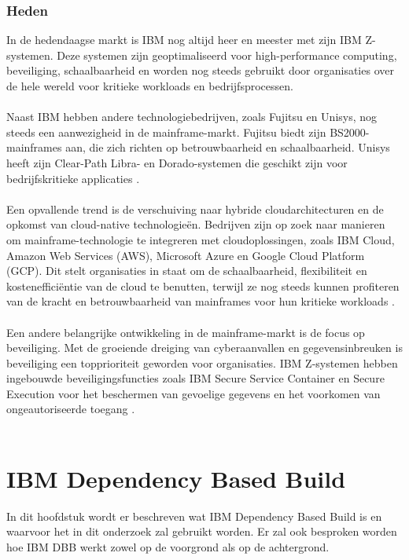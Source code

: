 \subsubsection{Heden}
In de hedendaagse markt is IBM nog altijd heer en meester met zijn IBM Z-systemen. Deze systemen zijn geoptimaliseerd voor high-performance computing, beveiliging, schaalbaarheid en worden nog steeds gebruikt door organisaties over de hele wereld voor kritieke workloads en bedrijfsprocessen.
\\ \\
Naast IBM hebben andere technologiebedrijven, zoals Fujitsu en Unisys, nog steeds een aanwezigheid in de mainframe-markt. Fujitsu biedt zijn BS2000-mainframes aan, die zich richten op betrouwbaarheid en schaalbaarheid. Unisys heeft zijn Clear-Path Libra- en Dorado-systemen die geschikt zijn voor bedrijfskritieke applicaties \autocite{Fujitsu} \autocite{Unisys}.
\\ \\
Een opvallende trend is de verschuiving naar hybride cloudarchitecturen en de opkomst van cloud-native technologieën. Bedrijven zijn op zoek naar manieren om mainframe-technologie te integreren met cloudoplossingen, zoals IBM Cloud, Amazon Web Services (AWS), Microsoft Azure en Google Cloud Platform (GCP). Dit stelt organisaties in staat om de schaalbaarheid, flexibiliteit en kostenefficiëntie van de cloud te benutten, terwijl ze nog steeds kunnen profiteren van de kracht en betrouwbaarheid van mainframes voor hun kritieke workloads \autocite{Google} \autocite{AWS}.
\\ \\
Een andere belangrijke ontwikkeling in de mainframe-markt is de focus op beveiliging. Met de groeiende dreiging van cyberaanvallen en gegevensinbreuken is beveiliging een topprioriteit geworden voor organisaties. IBM Z-systemen hebben ingebouwde beveiligingsfuncties zoals IBM Secure Service Container en Secure Execution voor het beschermen van gevoelige gegevens en het voorkomen van ongeautoriseerde toegang \autocite{IBMa}.
\\ \\
\section{IBM Dependency Based Build}
\label{sec:IBM dependency based build}
In dit hoofdstuk wordt er beschreven wat IBM Dependency Based Build is en waarvoor het in dit onderzoek zal gebruikt worden. Er zal ook besproken worden hoe IBM DBB werkt zowel op de voorgrond als op de achtergrond.
\\ \\
